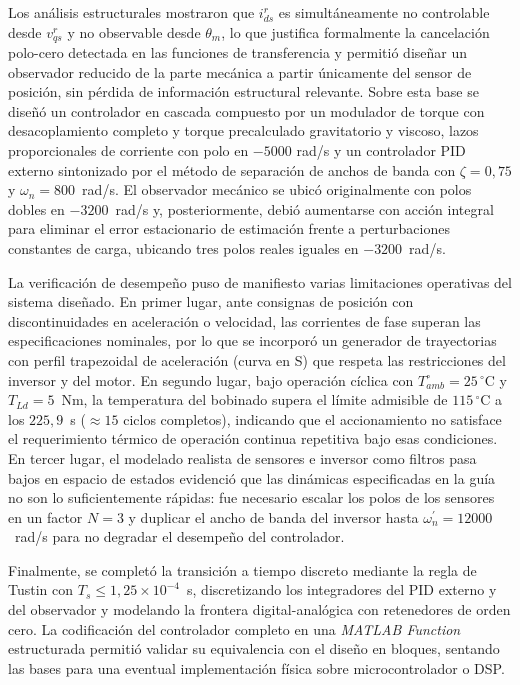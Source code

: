 \documentclass[12pt, a4paper,journal, onecolumn, compsoc]{IEEEtran}
\begin{document}
Los análisis estructurales mostraron que $i_{ds}^{r}$ es simultáneamente no controlable desde $v_{qs}^{r}$ y no observable desde $\theta_m$, lo que justifica formalmente la cancelación polo-cero detectada en las funciones de transferencia y permitió diseñar un observador reducido de la parte mecánica a partir únicamente del sensor de posición, sin pérdida de información estructural relevante. Sobre esta base se diseñó un controlador en cascada compuesto por un modulador de torque con desacoplamiento completo y torque precalculado gravitatorio y viscoso, lazos proporcionales de corriente con polo en $-5000$ rad/s y un controlador PID externo sintonizado por el método de separación de anchos de banda con $\zeta = 0{,}75$ y $\omega_n = 800$~rad/s. El observador mecánico se ubicó originalmente con polos dobles en $-3200$~rad/s y, posteriormente, debió aumentarse con acción integral para eliminar el error estacionario de estimación frente a perturbaciones constantes de carga, ubicando tres polos reales iguales en $-3200$~rad/s.

La verificación de desempeño puso de manifiesto varias limitaciones operativas del sistema diseñado. En primer lugar, ante consignas de posición con discontinuidades en aceleración o velocidad, las corrientes de fase superan las especificaciones nominales, por lo que se incorporó un generador de trayectorias con perfil trapezoidal de aceleración (curva en S) que respeta las restricciones del inversor y del motor. En segundo lugar, bajo operación cíclica con $T_{amb}^\circ=25\,^\circ$C y $T_{Ld}=5$~Nm, la temperatura del bobinado supera el límite admisible de $115\,^\circ$C a los $225{,}9$~s ($\approx 15$ ciclos completos), indicando que el accionamiento no satisface el requerimiento térmico de operación continua repetitiva bajo esas condiciones. En tercer lugar, el modelado realista de sensores e inversor como filtros pasa bajos en espacio de estados evidenció que las dinámicas especificadas en la guía no son lo suficientemente rápidas: fue necesario escalar los polos de los sensores en un factor $N=3$ y duplicar el ancho de banda del inversor hasta $\omega_n^{\prime}=12000$~rad/s para no degradar el desempeño del controlador.

Finalmente, se completó la transición a tiempo discreto mediante la regla de Tustin con $T_s \leq 1{,}25\times 10^{-4}$~s, discretizando los integradores del PID externo y del observador y modelando la frontera digital-analógica con retenedores de orden cero. La codificación del controlador completo en una \textit{MATLAB Function} estructurada permitió validar su equivalencia con el diseño en bloques, sentando las bases para una eventual implementación física sobre microcontrolador o DSP.
\end{document}
